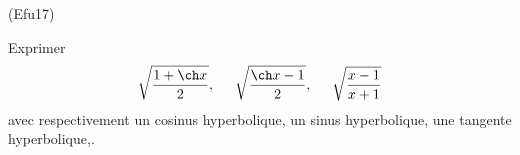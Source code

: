 \begin{tiny}(Efu17)\end{tiny} Exprimer 
\begin{displaymath}
\sqrt{\frac{1+\ch x}{2}},\hspace{0.5cm}
\sqrt{\frac{\ch x -1}{2}}, \hspace{0.5cm}\sqrt{\frac{x-1}{x+1}}
\end{displaymath}
avec respectivement un cosinus hyperbolique, un sinus hyperbolique, une tangente hyperbolique,.